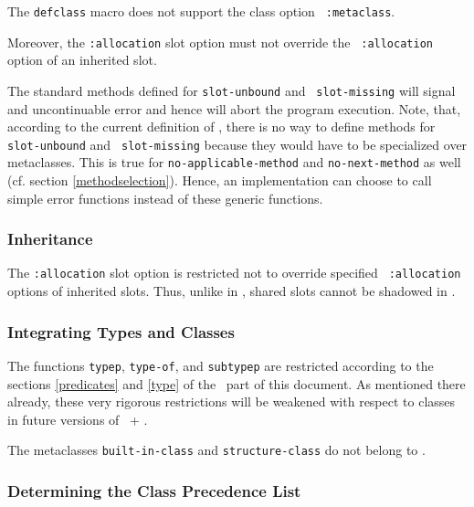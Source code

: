 The {\tt defclass} macro does not support the class option {\tt 
:metaclass}.

Moreover, the {\tt :allocation} slot option must not override the {\tt 
:allocation} option of an inherited slot. 

The standard methods defined for {\tt slot-unbound} and {\tt 
slot-missing} will signal and uncontinuable error and hence will abort the 
program execution. Note, that, according to the current definition of 
, there is no way to define methods for {\tt slot-unbound} and {\tt 
slot-missing} because they would have to be specialized over metaclasses. 
This is true for {\tt no-applicable-method} and {\tt no-next-method} as 
well (cf. section \ref{methodselection}). Hence, an implementation can choose to 
call simple error functions instead of these generic functions.

\subsubsection{Inheritance}
\label{inheritance}

The {\tt :allocation} slot option is restricted not to override specified {\tt 
:allocation} options of inherited slots. Thus, unlike in \CLOS, shared 
slots cannot be shadowed in .

\subsubsection{Integrating Types and Classes}
\label{classtypes}

The functions {\tt typep}, {\tt type-of}, and {\tt subtypep} are restricted 
according to the sections \ref{predicates} and \ref{type} of the 
\ part of this document. As 
mentioned there already, these very rigorous restrictions will be weakened 
with respect to classes in future versions of \ + .

The metaclasses {\tt built-in-class} and {\tt structure-class} do not 
belong to .

\subsubsection{Determining the Class Precedence List}
\label{classprecedence}

